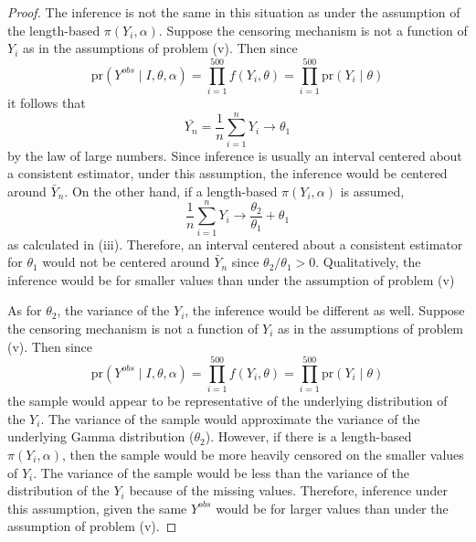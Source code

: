 \documentclass[letterpaper, 12pt]{article}
\newcommand{\pr}{\text{pr}}
\newcommand{\sbs}{\;|\;} %
\begin{document}
\begin{enumerate}[(i)]
\begin{proof}
The inference is not the same in this situation as under the assumption of the length-based $\pi(Y_i,\alpha)$. Suppose the censoring mechanism is not a function of $Y_i$ as in the assumptions of problem (v). Then since
\begin{equation}
\pr(Y^{obs}\sbs I, \theta, \alpha) = \prod_{i=1}^{500} 
f(Y_i, \theta)
=
\prod_{i=1}^{500} 
\pr(Y_i \sbs \theta)
\end{equation}
it follows that
\begin{equation}
\bar{Y_n} = \frac{1}{n} \sum_{i=1}^n Y_i \to \theta_1
\end{equation}
by the law of large numbers. Since inference is usually an interval centered about a consistent estimator, under this assumption, the inference would be centered around $\bar{Y}_n$.
On the other hand, if a length-based $\pi(Y_i,\alpha)$ is assumed, 
\begin{equation}
\frac{1}{n} \sum_{i=1}^n Y_i \to \frac{\theta_2}{\theta_1} +\theta_1
\end{equation}
as calculated in (iii). Therefore, an interval centered about a consistent estimator for $\theta_1$ would not be centered around $\bar{Y}_n$ since $\theta_2/\theta_1 > 0$. Qualitatively, the inference would be for smaller values than under the assumption of problem (v)

As for $\theta_2$, the variance of the $Y_i$, the inference would be different as well. Suppose the censoring mechanism is not a function of $Y_i$ as in the assumptions of problem (v). Then since 
\begin{equation}
\pr(Y^{obs}\sbs I, \theta, \alpha) = \prod_{i=1}^{500} 
f(Y_i, \theta)
=
\prod_{i=1}^{500} 
\pr(Y_i \sbs \theta)
\end{equation}
the sample would appear to be representative of the underlying distribution of the $Y_i$. The variance of the sample would approximate the variance of the underlying Gamma distribution ($\theta_2$). However, if there is a length-based $\pi(Y_i, \alpha)$, then the sample would be more heavily censored on the smaller values of $Y_i$. The variance of the sample would be less than the variance of the distribution of the $Y_i$ because of the missing values. Therefore, inference under this assumption, given the same $Y^{obs}$ would be for larger values than under the assumption of problem (v). 
\end{proof}
\end{enumerate}
\end{document}
